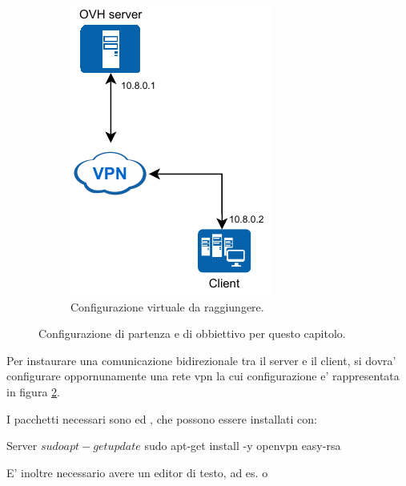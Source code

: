 \begin{figure}[H]
\begin{subfigure}{0.5\textwidth}
        \includegraphics[height=1.2\linewidth]{immagini/diag-simple_ips_vpn}
        \caption{Configurazione virtuale da raggiungere.}
        \label{fig:diag-simple_ips_vpn}
    \end{subfigure}%
    \caption{Configurazione di partenza e di obbiettivo per questo capitolo. \cite{icons}}
\end{figure}

Per instaurare una comunicazione bidirezionale tra il server e il client, si dovra' configurare oppornunamente una rete vpn la cui configurazione e' rappresentata in figura \ref{fig:diag-simple_ips_vpn}.

I pacchetti necessari sono  ed , che possono essere installati con:

\begin{bashcode}{Server}{}
$ sudo apt-get update
$ sudo apt-get install -y openvpn easy-rsa
\end{bashcode}

E' inoltre necessario avere un editor di testo, ad es.  o 


